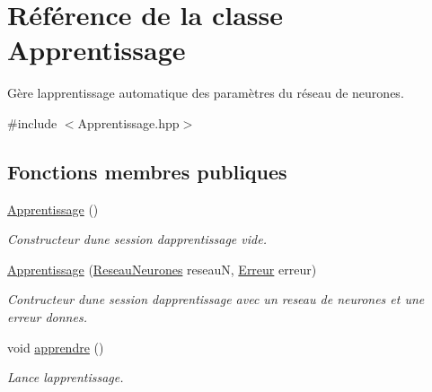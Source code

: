 \hypertarget{classApprentissage}{}\section{Référence de la classe Apprentissage}
\label{classApprentissage}


Gère l\textquotesingle{}apprentissage automatique des paramètres du réseau de neurones.  




{\ttfamily \#include $<$Apprentissage.\+hpp$>$}

\subsection*{Fonctions membres publiques}
\begin{DoxyCompactItemize}
\item 
\mbox{\label{classApprentissage_a649ffeeec970b5ad604b41a987844387}} 
\hyperlink{classApprentissage_a649ffeeec970b5ad604b41a987844387}{Apprentissage} ()
\begin{DoxyCompactList}\small\item\em Constructeur d\textquotesingle{}une session d\textquotesingle{}apprentissage vide. \end{DoxyCompactList}\item 
\mbox{\label{classApprentissage_a1a510815ab52c24fb92bf9d5e0686101}} 
\hyperlink{classApprentissage_a1a510815ab52c24fb92bf9d5e0686101}{Apprentissage} (\hyperlink{classReseauNeurones}{Reseau\+Neurones} reseauN, \hyperlink{classErreur}{Erreur} erreur)
\begin{DoxyCompactList}\small\item\em Contructeur d\textquotesingle{}une session d\textquotesingle{}apprentissage avec un reseau de neurones et une erreur donnes. \end{DoxyCompactList}\item 
\mbox{\label{classApprentissage_aa90784b8d9692d451b1d9242bbe15554}} 
void \hyperlink{classApprentissage_aa90784b8d9692d451b1d9242bbe15554}{apprendre} ()
\begin{DoxyCompactList}\small\item\em Lance l\textquotesingle{}apprentissage. \end{DoxyCompactList}\item 

\end{DoxyCompactItemize}
